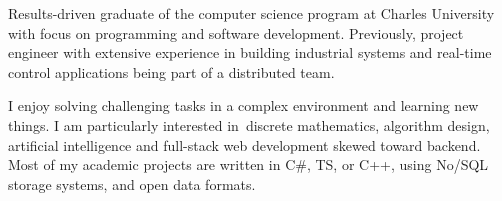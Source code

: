 Results-driven graduate of the computer science program at Charles University with focus on programming and software development. Previously, project engineer with extensive experience in building industrial systems and real-time control applications being part of a distributed team.

I enjoy solving challenging tasks in a complex environment and learning new things. I am particularly interested in~dis\-crete mathematics, algorithm design, artificial intelligence and full-stack web development skewed toward backend. Most of my academic projects are written in C\#, TS, or C++, using No/SQL storage systems, and open data formats.
